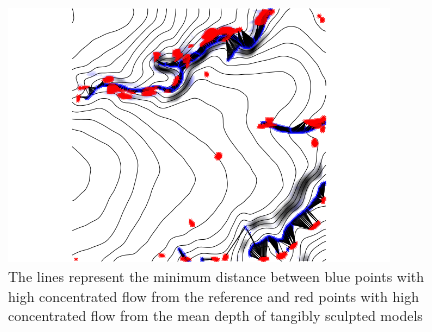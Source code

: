 \documentclass{isprs}
\begin{document}
\begin{figure}
\begin{center}
\includegraphics[width=0.9\textwidth]{figures/concentrated_flow_2.png}
\caption{
The lines represent the minimum distance between blue points with high concentrated flow from the reference and red points with high concentrated flow from the mean depth of tangibly sculpted models}
\label{fig:distance_2}
\end{center}
\end{figure}

 
\end{document}
